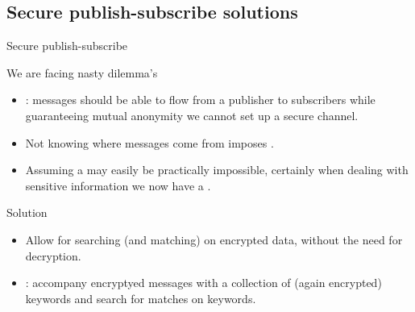 \subsection{Secure publish-subscribe solutions}
\begin{slide}{Secure publish-subscribe}
  \begin{alertblock}{We are facing nasty dilemma's}
    \begin{itemize}
    \item {}: messages should be able to flow from a publisher to subscribers while
      guaranteeing mutual anonymity \mathexpr{\Rightarrow} we cannot set up a secure channel.
    \item Not knowing where messages come from imposes .
    \item Assuming a  may easily be practically impossible, certainly when dealing with
      sensitive information \mathexpr{\Rightarrow} we now have a .
    \end{itemize}
  \end{alertblock}
  \onslide
  \begin{block}{Solution}
    \begin{itemize}
    \item Allow for searching (and matching) on encrypted data, without the need for decryption.
    \item {}: accompany encryptyed messages with a collection of (again encrypted) keywords and
      search for matches on keywords.
    \end{itemize}
  \end{block}
\end{slide}
